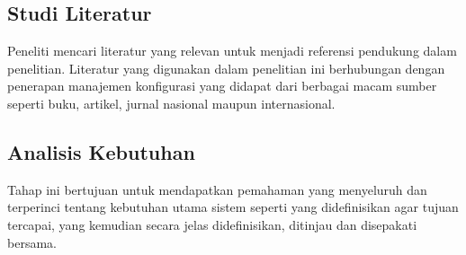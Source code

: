 \documentclass[10pt,]{report}
\begin{document}
\begin{adjustwidth}{7mm}{}
	\subsection{Studi Literatur}
	\vspace{-3mm}
	\begin{adjustwidth}{6mm}{}
		Peneliti mencari literatur yang relevan untuk menjadi referensi pendukung dalam
		penelitian. Literatur yang digunakan dalam penelitian ini berhubungan
		dengan penerapan manajemen konfigurasi yang didapat dari berbagai macam
		sumber seperti buku, artikel, jurnal nasional maupun internasional.
	\end{adjustwidth}
\end{adjustwidth}
\begin{adjustwidth}{7mm}{}
	\subsection{Analisis Kebutuhan}
	\vspace{-3mm}
	\begin{adjustwidth}{6mm}{}
		Tahap ini bertujuan untuk mendapatkan pemahaman yang menyeluruh dan terperinci
		tentang kebutuhan utama sistem seperti yang didefinisikan agar tujuan
		tercapai, yang kemudian secara jelas didefinisikan, ditinjau dan disepakati
		bersama.
	\end{adjustwidth}
\end{adjustwidth}
\end{document}
